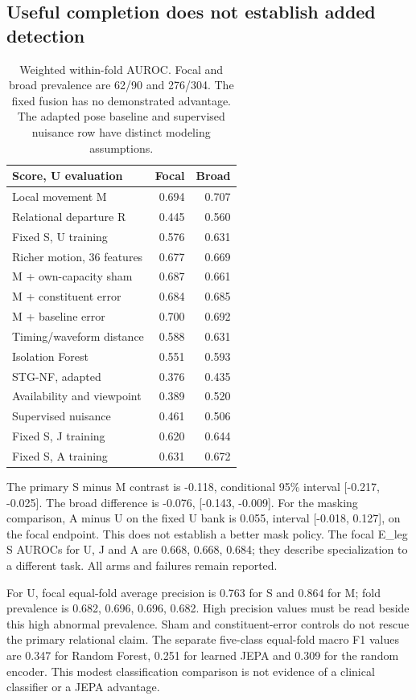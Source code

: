 \documentclass[letterpaper]{article}
\begin{document}
\subsection{Useful completion does not establish added detection}

\begin{table}[t]
\centering
\begin{tabular}{lrr}
\toprule
Score, U evaluation & Focal & Broad \\
\midrule
Local movement M & 0.694 & 0.707 \\
Relational departure R & 0.445 & 0.560 \\
Fixed S, U training & 0.576 & 0.631 \\
Richer motion, 36 features & 0.677 & 0.669 \\
M + own-capacity sham & 0.687 & 0.661 \\
M + constituent error & 0.684 & 0.685 \\
M + baseline error & 0.700 & 0.692 \\
Timing/waveform distance & 0.588 & 0.631 \\
Isolation Forest & 0.551 & 0.593 \\
STG-NF, adapted & 0.376 & 0.435 \\
Availability and viewpoint & 0.389 & 0.520 \\
Supervised nuisance & 0.461 & 0.506 \\
Fixed S, J training & 0.620 & 0.644 \\
Fixed S, A training & 0.631 & 0.672 \\
\bottomrule
\end{tabular}
\caption{Weighted within-fold AUROC. Focal and broad prevalence are 62/90 and 276/304. The fixed fusion has no demonstrated advantage. The adapted pose baseline and supervised nuisance row have distinct modeling assumptions.}
\label{tab:detection}
\end{table}

The primary S minus M contrast is -0.118, conditional 95\% interval {[}-0.217, -0.025{]}. The broad difference is -0.076, {[}-0.143, -0.009{]}. For the masking comparison, A minus U on the fixed U bank is 0.055, interval {[}-0.018, 0.127{]}, on the focal endpoint. This does not establish a better mask policy. The focal E\_leg S AUROCs for U, J and A are 0.668, 0.668, 0.684; they describe specialization to a different task. All arms and failures remain reported.

For U, focal equal-fold average precision is 0.763 for S and 0.864 for M; fold prevalence is 0.682, 0.696, 0.696, 0.682. High precision values must be read beside this high abnormal prevalence. Sham and constituent-error controls do not rescue the primary relational claim. The separate five-class equal-fold macro F1 values are 0.347 for Random Forest, 0.251 for learned JEPA and 0.309 for the random encoder. This modest classification comparison is not evidence of a clinical classifier or a JEPA advantage.
\end{document}
